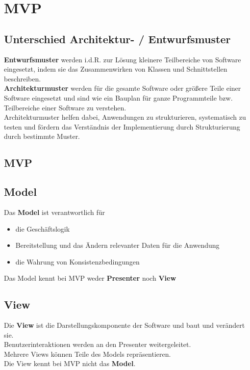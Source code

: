\section{MVP}


\subsection{Unterschied Architektur- / Entwurfsmuster}

\textbf{Entwurfsmuster} werden i.d.R. zur Lösung kleinere Teilbereiche von Software eingesetzt, indem sie das Zusammenwirken von Klassen und Schnittstellen beschreiben.\\

\noindent
\textbf{Architekturmuster} werden für die gesamte Software oder größere Teile einer Software eingesetzt und sind wie ein Bauplan für ganze Programmteile bzw. Teilbereiche einer Software zu verstehen.\\

\noindent
Architekturmuster helfen dabei, Anwendungen zu strukturieren, systematisch zu testen und fördern das Verständnis der Implementierung durch Strukturierung durch bestimmte Muster.

\subsection{MVP}

\subsection*{Model}
Das \textbf{Model} ist verantwortlich für

\begin{itemize}
    \item die Geschäftslogik
    \item Bereitstellung und das Ändern relevanter Daten für die Anwendung
    \item die Wahrung von Konsistenzbedingungen
\end{itemize}

\noindent
Das Model kennt bei MVP weder \textbf{Presenter} noch \textbf{View}

\subsection*{View}
Die \textbf{View} ist die Darstellungskomponente der Software und baut und verändert sie. \\
Benutzerinteraktionen werden an den Presenter weitergeleitet.\\
Mehrere Views können Teile des Models repräsentieren.\\
Die View kennt bei MVP nicht das \textbf{Model}.


